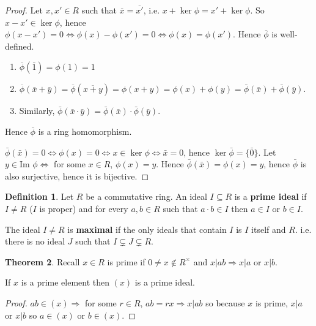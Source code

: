 \documentclass[12pt,a4paper]{article}
\theoremstyle{definition}
\newtheorem{definition}{Definition}[subsection]
\newtheorem{theorem}[definition]{Theorem}
\begin{document}
\begin{proof}
	Let $x, x' \in R$ such that $\overline{x} = \overline{x'}$, i.e. $x + \ker \phi = x' + \ker \phi$. So $x - x' \in \ker \phi$, hence $\phi(x - x') = 0 \Leftrightarrow \phi(x) - \phi(x') = 0 \Leftrightarrow \phi(x) = \phi(x')$. Hence $\overline{\phi}$ is well-defined.

	\begin{enumerate}
		\item $\overline{\phi}(\bar{1}) = \phi(1) = 1$
		\item $\overline{\phi}(\bar{x} + \bar{y}) = \overline{\phi}(\overline{x + y}) = \phi(x + y) = \phi(x) + \phi(y) = \bar{\phi}(\bar{x}) + \bar{\phi}(\bar{y})$.
		\item Similarly, $\bar{\phi}(\bar{x}\cdot \bar{y}) = \bar{\phi}(\bar{x}) \cdot \bar{\phi}(\bar{y})$.
	\end{enumerate}

	Hence $\bar{\phi}$ is a ring homomorphism.

	$\bar{\phi}(\bar{x}) = 0 \Leftrightarrow \phi(x) = 0 \Leftrightarrow x \in \ker \phi \Leftrightarrow \bar{x} = 0$, hence $\ker \bar{\phi} = \{\bar{0}\}$.
	Let $y \in \text{Im } \phi \Leftrightarrow$ for some $x \in R$, $\phi(x) = y$. Hence $\bar{\phi}(\bar{x}) = \phi(x) = y$, hence $\bar{\phi}$ is also surjective, hence it is bijective.
\end{proof}

\begin{definition}
	Let $R$ be a commutative ring. An ideal $I \subseteq R$ is a \textbf{prime ideal} if $I \ne R$ ($I$ is proper) and for every $a, b \in R$ such that $a \cdot b \in I$ then $a \in I$ or $b \in I$.

	The ideal $I \ne R$ is \textbf{maximal} if the only ideals that contain $I$ is $I$ itself and $R$. i.e. there is no ideal $J$ such that $I \subsetneq J \subsetneq R$.
\end{definition}

\begin{theorem}
	Recall $x \in R$ is prime if $0 \ne x \notin R^{\times}$ and $x | ab \Rightarrow x | a$ or $x | b$.

	If $x$ is a prime element then $(x)$ is a prime ideal.
\end{theorem}

\begin{proof}
	$ab \in (x) \Rightarrow$ for some $r \in R$, $ab = rx \Rightarrow x | ab$ so because $x$ is prime, $x | a$ or $x | b$ so $a \in (x)$ or $b \in (x)$.
\end{proof}
\end{document}
